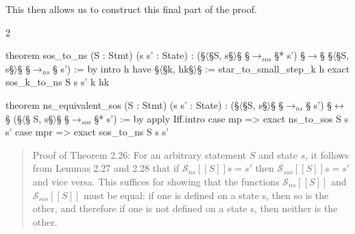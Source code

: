 This then allows us to construct this final part of the proof.
\begin{paracol}{2}
\begin{leftcolumn}
    \begin{Lean_Code}
theorem sos_to_ns
    (S : Stmt)
    (s s' : State) :
    (§\(\langle\)§S, s§\(\rangle\)§ §\(\to_{sos}\)§* s') §\(\to\)§
     §\(\langle\)§S, s§\(\rangle\)§ §\(\to_{ns}\)§ s') := by
  intro h
  have §\(\langle\)§k, hk§\(\rangle\)§ :=
    star_to_small_step_k h
  exact sos_k_to_ns
    S s s' k hk

theorem ns_equivalent_sos
    (S : Stmt)
    (s s' : State) :
    (§\(\langle\)§S, s§\(\rangle\)§ §\(\to_{ns}\)§ s') §\(\leftrightarrow\)§
    (§\(\langle\)§ S, s§\(\rangle\)§ §\(\to_{sos}\)§* s') := by
  apply Iff.intro
  case mp =>
    exact ns_to_sos S s s'
  case mpr =>
    exact sos_to_ns S s s'
    \end{Lean_Code}
\end{leftcolumn}
\begin{rightcolumn}
\begin{quotation}
\noindent
Proof of Theorem 2.26:
For an arbitrary statement \(S\) and state \(s\), it follows from
Lemmas 2.27 and 2.28 that if \(\mathcal{S}_{ns}[\![S]\!]s = s'\) then \(\mathcal{S}_{sos}[\![S]\!]s = s'\) and vice versa.
This suﬃces for showing that the functions \(\mathcal{S}_{ns}[\![S]\!]\) and \(\mathcal{S}_{sos}[\![S]\!]\) must be equal:
if one is defined on a state s, then so is the other, and therefore if one is not
defined on a state s, then neither is the other.
\end{quotation}
\end{rightcolumn}
\end{paracol}
\vspace{1em}


